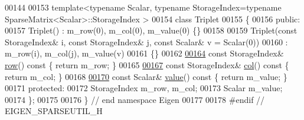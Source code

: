 \begin{DoxyCode}
00144 
00153 template<typename Scalar, typename StorageIndex=typename SparseMatrix<Scalar>::StorageIndex >
00154 \textcolor{keyword}{class }Triplet
00155 \{
00156 \textcolor{keyword}{public}:
00157   Triplet() : m\_row(0), m\_col(0), m\_value(0) \{\}
00158 
00159   Triplet(\textcolor{keyword}{const} StorageIndex& i, \textcolor{keyword}{const} StorageIndex& j, \textcolor{keyword}{const} Scalar& v = Scalar(0))
00160     : m\_row(i), m\_col(j), m\_value(v)
00161   \{\}
00162 
\hyperlink{group___sparse_core___module_ae88b0ad6d31daa53e298b9cc4201fdee}{00164}   \textcolor{keyword}{const} StorageIndex& \hyperlink{group___sparse_core___module_ae88b0ad6d31daa53e298b9cc4201fdee}{row}()\textcolor{keyword}{ const }\{ \textcolor{keywordflow}{return} m\_row; \}
00165 
\hyperlink{group___sparse_core___module_a3531e3e2098507a069a368d72d46471e}{00167}   \textcolor{keyword}{const} StorageIndex& \hyperlink{group___sparse_core___module_a3531e3e2098507a069a368d72d46471e}{col}()\textcolor{keyword}{ const }\{ \textcolor{keywordflow}{return} m\_col; \}
00168 
\hyperlink{group___sparse_core___module_a003ea53c6559b106406f7916d6610547}{00170}   \textcolor{keyword}{const} Scalar& \hyperlink{group___sparse_core___module_a003ea53c6559b106406f7916d6610547}{value}()\textcolor{keyword}{ const }\{ \textcolor{keywordflow}{return} m\_value; \}
00171 \textcolor{keyword}{protected}:
00172   StorageIndex m\_row, m\_col;
00173   Scalar m\_value;
00174 \};
00175 
00176 \} \textcolor{comment}{// end namespace Eigen}
00177 
00178 \textcolor{preprocessor}{#endif // EIGEN\_SPARSEUTIL\_H}
\end{DoxyCode}
